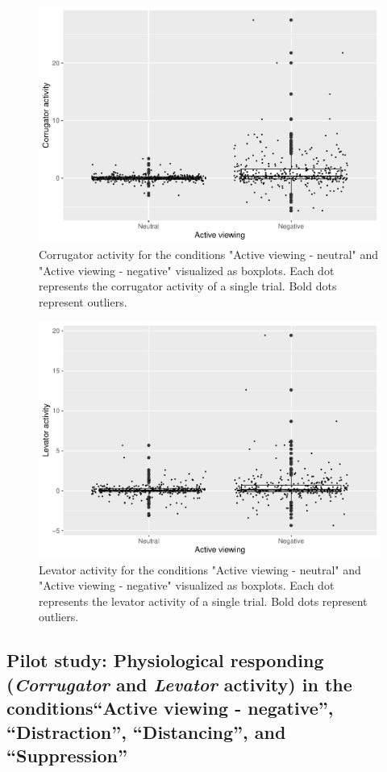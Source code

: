 \documentclass[
  english,
  man,floatsintext]{apa6}
\begin{document}
\begin{figure}[H]
\includegraphics[width=0.75\linewidth]{Manuscript_ERED_Stage1_files/figure-latex/FigEMGCorrViewPilot-1} \caption{Corrugator activity for the conditions "Active viewing - neutral" and "Active viewing - negative" visualized as boxplots. Each dot represents the corrugator activity of a single trial. Bold dots represent outliers.}\label{fig:FigEMGCorrViewPilot}
\end{figure}
\begin{figure}[H]
\includegraphics[width=0.75\linewidth]{Manuscript_ERED_Stage1_files/figure-latex/FigEMGLevViewPilot-1} \caption{Levator activity for the conditions "Active viewing - neutral" and "Active viewing - negative" visualized as boxplots. Each dot represents the levator activity of a single trial. Bold dots represent outliers.}\label{fig:FigEMGLevViewPilot}
\end{figure}

\hypertarget{pilot-study-physiological-responding-corrugator-and-levator-activity-in-the-conditionsactive-viewing---negative-distraction-distancing-and-suppression}{%
\subsection{\texorpdfstring{Pilot study: Physiological responding (\emph{Corrugator} and \emph{Levator} activity) in the conditions``Active viewing - negative'', ``Distraction'', ``Distancing'', and ``Suppression''}{Pilot study: Physiological responding (Corrugator and Levator activity) in the conditions``Active viewing - negative'', ``Distraction'', ``Distancing'', and ``Suppression''}}\label{pilot-study-physiological-responding-corrugator-and-levator-activity-in-the-conditionsactive-viewing---negative-distraction-distancing-and-suppression}}
\end{document}
